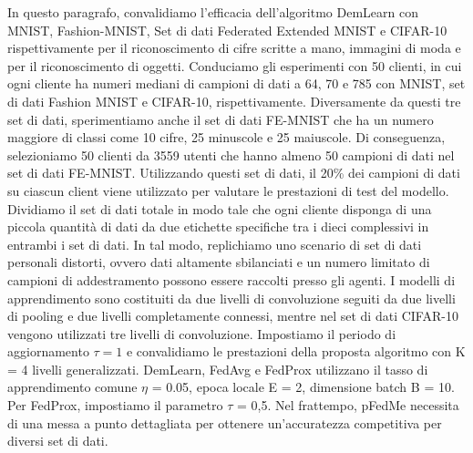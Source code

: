 In questo paragrafo, convalidiamo l'efficacia dell'algoritmo DemLearn con MNIST, Fashion-MNIST, Set di dati Federated Extended MNIST e CIFAR-10 rispettivamente per il riconoscimento di cifre scritte a mano, immagini di moda e per il riconoscimento di oggetti. Conduciamo gli esperimenti con 50 clienti, in cui ogni cliente ha numeri mediani di campioni di dati a 64, 70 e 785 con MNIST, set di dati Fashion MNIST e CIFAR-10, rispettivamente. Diversamente da questi tre set di dati, sperimentiamo anche il set di dati FE-MNIST che ha un numero maggiore di classi come 10 cifre, 25 minuscole e 25 maiuscole. Di conseguenza, selezioniamo 50 clienti da 3559 utenti che hanno almeno 50 campioni di dati nel set di dati FE-MNIST. Utilizzando questi set di dati, il 20\% dei campioni di dati su ciascun client viene utilizzato per valutare le prestazioni di test del modello. Dividiamo il set di dati totale in modo tale che ogni cliente disponga di una piccola quantità di dati da due etichette specifiche tra i dieci complessivi in entrambi i set di dati. In tal modo, replichiamo uno scenario di set di dati personali distorti, ovvero dati altamente sbilanciati e un numero limitato di campioni di addestramento possono essere raccolti presso gli agenti. I modelli di apprendimento sono costituiti da due livelli di convoluzione seguiti da due livelli di pooling e due livelli completamente connessi, mentre nel set di dati CIFAR-10 vengono utilizzati tre livelli di convoluzione. Impostiamo il periodo di aggiornamento $\tau=1$ e convalidiamo le prestazioni della proposta algoritmo con K = 4 livelli generalizzati. DemLearn, FedAvg e FedProx utilizzano il tasso di apprendimento comune $\eta$ = 0.05, epoca locale E = 2, dimensione batch B = 10.
Per FedProx, impostiamo il parametro $\tau$ = 0,5. Nel frattempo, pFedMe necessita di una messa a punto dettagliata per ottenere un'accuratezza competitiva per diversi set di dati.\\
